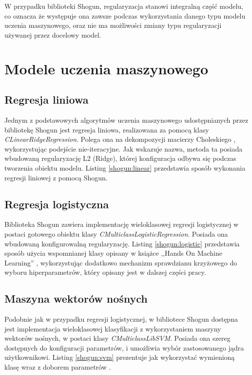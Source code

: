 W przypadku biblioteki Shogun, regularyzacja stanowi integralną część modelu, co oznacza że występuje ona zawsze podczas wykorzystania danego typu modelu uczenia maszynowego, oraz nie ma możliwości zmiany typu regularyzacji używanej przez docelowy model.

\section{Modele uczenia maszynowego}
\subsection{Regresja liniowa}
Jednym z podstawowych algorytmów uczenia maszynowego udostępnianych przez bibliotekę Shogun jest regresja liniowa, realizowana za pomocą klasy \textit{CLinearRidgeRegression}. Polega ona na dekompozycji macierzy Choleskiego \cite{handsOnMachineLearning}, wykorzystując podejście nie-iteracyjne. Jak wskazuje nazwa, metoda ta posiada wbudowaną regularyzację L2 (Ridge), której konfiguracja odbywa się podczas tworzenia obiektu modelu. Listing \ref{shogun:linear} przedstawia sposób wykonania regresji liniowej z pomocą Shogun.


\subsection{Regresja logistyczna}
Biblioteka Shogun zawiera implementację wieloklasowej regresji logistycznej w postaci gotowego obiektu klasy \textit{CMulticlassLogisticRegression}. Posiada ona wbudowaną konfigurowalną regularyzację. Listing \ref{shogun:logistic} przedstawia sposób użycia wspomnianej klasy opisany w książce ,,Hands On Machine Learning'' \cite{handsOnMachineLearning}, wykorzystując dodatkowo mechanizm sprawdzianu krzyżowego do wyboru hiperparametrów, który opisany jest w dalszej części pracy.


\subsection{Maszyna wektorów nośnych}
Podobnie jak w przypadku regresji logistycznej, w bibliotece Shogun dostępna jest implementacja wieloklasowej klasyfikacji z wykorzystaniem maszyny wektorów nośnych, w postaci klasy \textit{CMulticlassLibSVM}. Posiada ona szereg dostępnych do konfiguracji parametrów, i umożliwia wybór zastosowanego jądra użytkownikowi. Listing \ref{shogun:svm} prezentuje jak wykorzystać wymienioną klasę wraz z doborem parametrów \cite{handsOnMachineLearning}.


